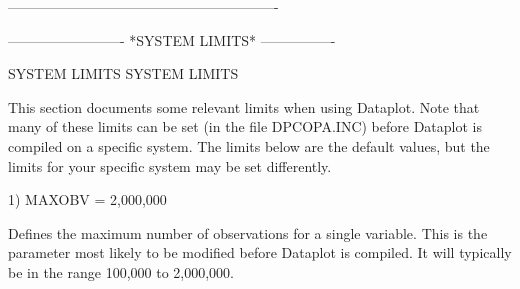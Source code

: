 ----------------------------------------------------------





















































































-------------------------  *SYSTEM LIMITS*  ----------------
 
SYSTEM LIMITS
SYSTEM LIMITS
 
This section documents some relevant limits when using Dataplot.
Note that many of these limits can be set (in the file DPCOPA.INC)
before Dataplot is compiled on a specific system.  The limits below
are the default values, but the limits for your specific system may
be set differently.


  1) MAXOBV   = 2,000,000

     Defines the maximum number of observations for a single
     variable.  This is the parameter most likely to be modified
     before Dataplot is compiled.  It will typically be in the
     range 100,000 to 2,000,000.

